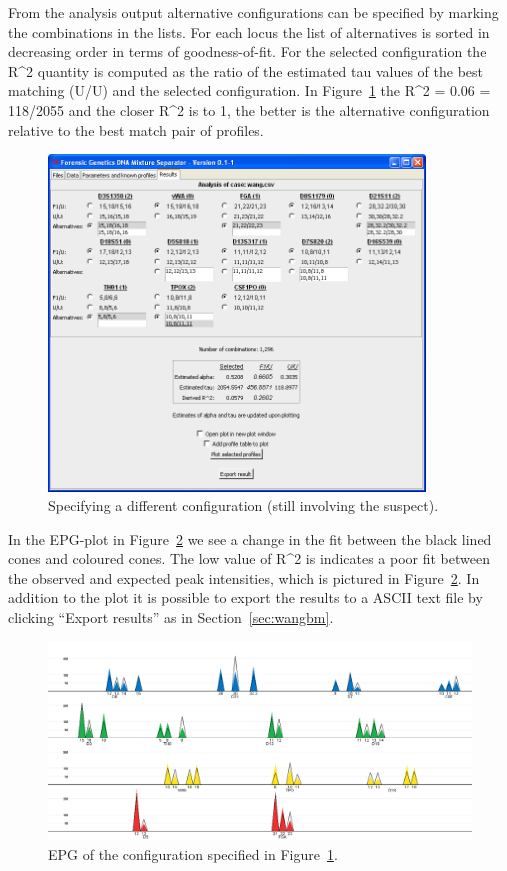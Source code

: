 \documentclass[a4paper,11pt]{article}
\begin{document}
From the analysis output alternative configurations can be specified
by marking the combinations in the lists. For each locus the list of
alternatives is sorted in decreasing order in terms of
goodness-of-fit. For the selected configuration the R\^{}2 quantity is
computed as the ratio of the estimated tau values of the best matching
(U/U) and the selected configuration. In
Figure~\ref{fig:resultsuspectalt} the R\^{}2 = 0.06 = 118/2055 and the
closer R\^{}2 is to 1, the better is the alternative configuration
relative to the best match pair of profiles.

\begin{figure}[!h]
  \centering
  \includegraphics[width=10cm]{result_suspectalternative}
  \caption{\label{fig:resultsuspectalt}Specifying a different
    configuration (still involving the suspect).}
\end{figure}

In the EPG-plot in Figure~\ref{fig:plotsuspectalt} we see a change in
the fit between the black lined cones and coloured cones. The low
value of R\^{}2 is indicates a poor fit between the observed and
expected peak intensities, which is pictured in
Figure~\ref{fig:plotsuspectalt}. In addition to the plot it is
possible to export the results to a ASCII text file by clicking
``Export results'' as in Section~\ref{sec:wangbm}.

\begin{figure}[!h]
  \centering
  \includegraphics[width=15cm]{plot_suspectalternative}
  \caption{\label{fig:plotsuspectalt}EPG of the configuration
    specified in Figure~\ref{fig:resultsuspectalt}.}
\end{figure}
\end{document}
